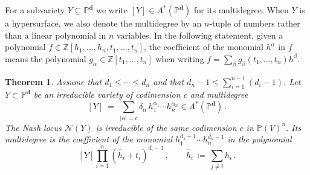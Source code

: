 \documentclass[12pt]{article}
\newtheorem{theorem}{Theorem}[section]
\theoremstyle{definition}
\newcommand{\Z}{{\mathbb Z}}
\newcommand{\PP}{{\mathbb P}}
\def\bd{{\boldsymbol{d}}}
\newcommand{\kn}{{\mathcal N}}
\begin{document}
For a subvariety $Y\subseteq\PP^\bd$ we write $[Y]\in A^*(\PP^\bd)$ for its multidegree. When $Y$ is a hypersurface, we also denote the multidegree by an $n$-tuple of numbers rather than a linear polynomial in $n$ variables. In the following statement, given a polynomial $f\in\Z[h_1,\ldots,h_n,t_1,\ldots,t_n]$, the coefficient of the monomial $h^\alpha$ in $f$ means the polynomial $g_\alpha \in \Z[t_1,\ldots,t_n]$ when writing $f=\sum_{\beta}g_\beta(t_1,\ldots,t_n)h^\beta$.

\begin{theorem}\label{thm: codim degree Nash locus}
Assume that $d_1\le\cdots\le d_n$ and that $d_n-1\le\sum_{i=1}^{n-1}(d_i-1)$. Let $Y\subset\PP^\bd$ be an irreducible variety of codimension $c$ and multidegree
\[
    [Y]\ =\ \sum_{|\alpha|=c}\delta_\alpha\,h_1^{\alpha_1}\cdots h_n^{\alpha_n}\in A^*(\PP^\bd)\,.
\]
The Nash locus $\kn(Y)$ is irreducible of the same codimension $c$ in $\PP(V)^{n}$. Its multidegree is the coefficient of the monomial $h_1^{d_1-1}\cdots h_n^{d_n-1}$ in the polynomial
\[
    [Y]\prod_{i=1}^n(\widehat{h}_i+t_i)^{d_i-1}\,,\qquad\widehat{h}_i\ \coloneqq\ \sum_{j\neq i}h_i\,.
\]
\end{theorem}
\end{document}
